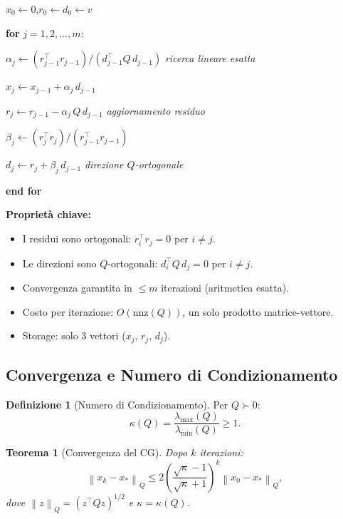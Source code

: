 \documentclass[11pt,a4paper]{article}
\theoremstyle{definition}
\newtheorem{definition}{Definizione}[section]
\theoremstyle{plain}
\newtheorem{theorem}{Teorema}[section]
\theoremstyle{remark}
\newenvironment{pseudocode}{%
  \begin{list}{}{%
    \setlength{\leftmargin}{1.5em}%
    \setlength{\itemsep}{2pt}%
    \setlength{\parsep}{0pt}%
    \setlength{\topsep}{4pt}%
  }%
}{%
  \end{list}%
}
\newcommand{\pcline}[1]{\item[] #1}
\newcommand{\pcindent}{\hspace{1.5em}}
\newcommand{\norm}[1]{\left\| #1 \right\|}
\newcommand{\T}{^{\top}}
\begin{document}
\begin{algobox}
  \begin{pseudocode}
    \pcline{$x_0 \leftarrow 0$,\quad $r_0 \leftarrow d_0 \leftarrow v$}
    \pcline{\textbf{for} $j = 1, 2, \ldots, m$:}
    \pcline{\pcindent $\alpha_j \leftarrow (r_{j-1}\T r_{j-1}) / (d_{j-1}\T Q\, d_{j-1})$
      \hfill \textit{ricerca lineare esatta}}
    \pcline{\pcindent $x_j \leftarrow x_{j-1} + \alpha_j\, d_{j-1}$}
    \pcline{\pcindent $r_j \leftarrow r_{j-1} - \alpha_j\, Q\, d_{j-1}$
      \hfill \textit{aggiornamento residuo}}
    \pcline{\pcindent $\beta_j \leftarrow (r_j\T r_j) / (r_{j-1}\T r_{j-1})$}
    \pcline{\pcindent $d_j \leftarrow r_j + \beta_j\, d_{j-1}$
      \hfill \textit{direzione $Q$-ortogonale}}
    \pcline{\textbf{end for}}
  \end{pseudocode}
\end{algobox}

\textbf{Proprietà chiave:}
\begin{itemize}[noitemsep]
  \item I residui sono ortogonali: $r_i\T r_j = 0$ per $i \neq j$.
  \item Le direzioni sono $Q$-ortogonali: $d_i\T Q\, d_j = 0$ per $i \neq j$.
  \item Convergenza garantita in $\leq m$ iterazioni (aritmetica esatta).
  \item Costo per iterazione: $O(\text{nnz}(Q))$, un solo prodotto matrice-vettore.
  \item Storage: solo 3 vettori ($x_j$, $r_j$, $d_j$).
\end{itemize}

\subsection{Convergenza e Numero di Condizionamento}

\begin{definition}[Numero di Condizionamento]
  Per $Q \succ 0$:
  \[
    \kappa(Q) = \frac{\lambda_{\max}(Q)}{\lambda_{\min}(Q)} \geq 1.
  \]
\end{definition}

\begin{theorem}[Convergenza del CG]
  Dopo $k$ iterazioni:
  \[
    \norm{x_k - x_*}_{Q} \leq 2\left(\frac{\sqrt{\kappa}-1}{\sqrt{\kappa}+1}\right)^k \norm{x_0 - x_*}_Q,
  \]
  dove $\norm{z}_Q = (z\T Qz)^{1/2}$ e $\kappa = \kappa(Q)$.
\end{theorem}
\end{document}
